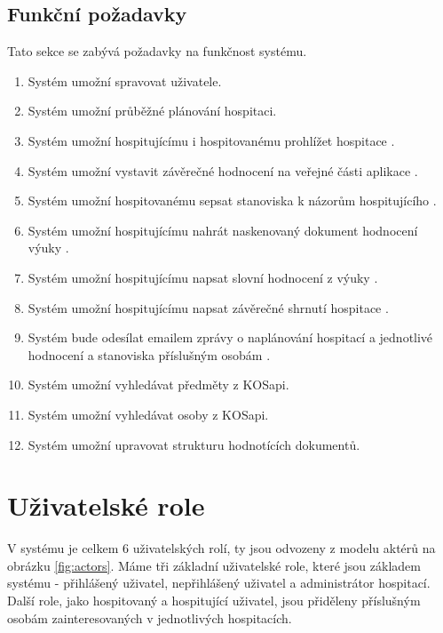 \subsection{Funkční požadavky}
Tato sekce se zabývá požadavky na funkčnost systému.
\begin{enumerate}
\item Systém umožní spravovat uživatele.
\item Systém umožní průběžné plánování hospitaci.
\item Systém umožní hospitujícímu i hospitovanému prohlížet hospitace \cite{prototyp_documentace}.
\item Systém umožní vystavit závěrečné hodnocení na veřejné části aplikace \cite{prototyp_documentace}. 
\item Systém umožní hospitovanému sepsat stanoviska k názorům hospitujícího \cite{prototyp_documentace}.
\item Systém umožní hospitujícímu nahrát naskenovaný dokument hodnocení výuky \cite{prototyp_documentace}.
\item Systém umožní hospitujícímu napsat slovní hodnocení z výuky \cite{prototyp_documentace}.
\item Systém umožní hospitujícímu napsat závěrečné shrnutí hospitace \cite{prototyp_documentace}.
\item Systém bude odesílat emailem zprávy o naplánování hospitací a jednotlivé hodnocení a stanoviska příslušným osobám \cite{prototyp_documentace}.
\item Systém umožní vyhledávat předměty z KOSapi.
\item Systém umožní vyhledávat osoby z KOSapi.
\item Systém umožní upravovat strukturu hodnotících dokumentů.
\end{enumerate}

\section{Uživatelské role}
V systému je celkem 6 uživatelských rolí, ty jsou odvozeny z modelu aktérů na obrázku \ref{fig:actors}. Máme tři základní uživatelské role, které jsou základem systému - přihlášený uživatel, nepřihlášený uživatel a administrátor hospitací. Další role, jako hospitovaný a hospitující uživatel, jsou přiděleny příslušným osobám zainteresovaných v jednotlivých hospitacích.

